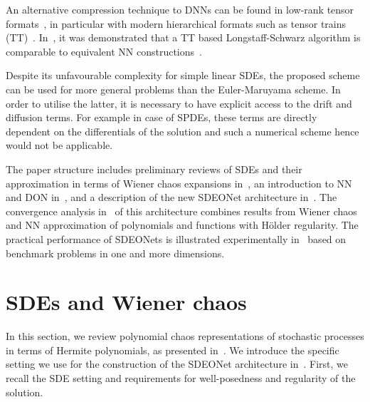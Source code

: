 \documentclass[12pt]{article}
\theoremstyle{remark}
\theoremstyle{plain}
\numberwithin{equation}{section}
\begin{document}
An alternative compression technique to DNNs can be found in low-rank tensor formats~\cite{hackbusch2014numerical,nouy2017low}, in particular with modern hierarchical formats such as tensor trains (TT)~\cite{oseledets2011tensor}.
In~\cite{bayer2023pricing}, it was demonstrated that a TT based Longstaff-Schwarz algorithm is comparable to equivalent NN constructions~\cite{becker2019deep}.

Despite its unfavourable complexity for simple linear SDEs, the proposed scheme can be used for more general problems than the Euler-Maruyama scheme. In order to utilise the latter, it is necessary to have explicit access to the drift and diffusion terms.
For example in case of SPDEs, these terms are directly dependent on the differentials of the solution and such a numerical scheme hence would not be applicable.

The paper structure includes preliminary reviews of SDEs and their approximation in terms of Wiener chaos expansions in~, an introduction to NN and DON in~, and a description of the new SDEONet architecture in~.
The convergence analysis in~ of this architecture combines results from Wiener chaos and NN approximation of polynomials and functions with H\"older regularity. The practical performance of SDEONets is illustrated experimentally in~ based on benchmark problems in one and more dimensions.
\section{SDEs and Wiener chaos}
\label{sec:sde}

In this section, we review polynomial chaos representations of stochastic processes in terms of Hermite polynomials, as presented in~\cite{Huschto2014}.
We introduce the specific setting we use for the construction of the SDEONet architecture in~.
First, we recall the SDE setting and requirements for well-posedness and regularity of the solution.
 
\end{document}
